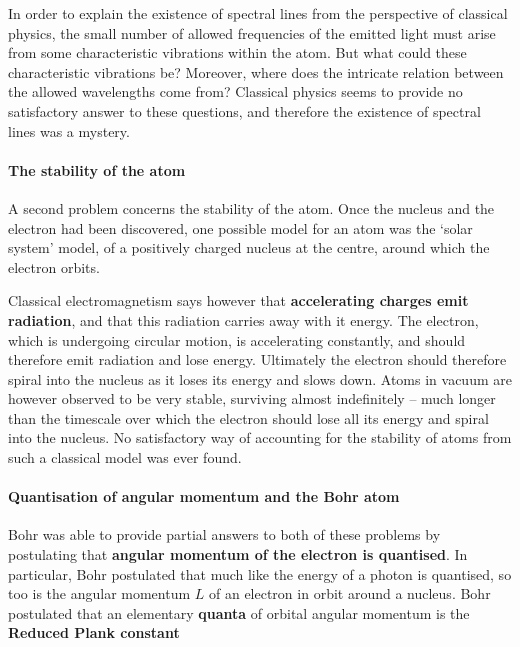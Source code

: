 \documentclass{article}
\begin{document}
In order to explain the existence of spectral lines from the perspective of classical physics, the small number of allowed frequencies of the emitted light must arise from some characteristic vibrations within the atom. But what could these characteristic vibrations be? Moreover, where does the intricate relation between the allowed wavelengths come from? Classical physics seems to provide no satisfactory answer to these questions, and therefore the existence of spectral lines was a mystery.

\paragraph{The stability of the atom}\label{The stability of the atom}

A second problem concerns the stability of the atom. Once the nucleus and the electron had been discovered, one possible model for an atom was the `solar system' model, of a positively charged nucleus at the centre, around which the electron orbits.

Classical electromagnetism says however that \textbf{accelerating charges emit radiation}, and that this radiation carries away with it energy. The electron, which is undergoing circular motion, is accelerating constantly, and should therefore emit radiation and lose energy. Ultimately the electron should therefore spiral into the nucleus as it loses its energy and slows down.  Atoms in vacuum are however observed to be very stable, surviving almost indefinitely -- much longer than the timescale over which the electron should lose all its energy and spiral into the nucleus. No satisfactory way of accounting for the stability of atoms from such a classical model was ever found.

\paragraph{Quantisation of angular momentum and the Bohr atom}\label{Quantisation of angular momentum and the Bohr atom}

Bohr was able to provide partial answers to both of these problems by postulating that \textbf{angular momentum of the electron is quantised}. In particular, Bohr postulated that much like the energy of a photon is quantised, so too is the angular momentum $L$ of an electron in orbit around a nucleus. Bohr postulated that an elementary \textbf{quanta} of orbital angular momentum is the \textbf{Reduced Plank constant}
\end{document}
